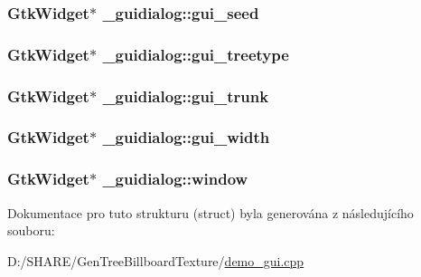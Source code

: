 \label{struct__guidialog_a129528d8a16803cce010dc3dfab8797a}
\hypertarget{struct__guidialog_a3c4e66ea5fc40eb370ec4f0d20e3bb1e}{
\subsubsection[{gui\_\-seed}]{\setlength{\rightskip}{0pt plus 5cm}GtkWidget$\ast$ {\bf \_\-guidialog::gui\_\-seed}}}
\label{struct__guidialog_a3c4e66ea5fc40eb370ec4f0d20e3bb1e}
\hypertarget{struct__guidialog_a48c9ce6f5655422686cd48b8ea56ebcc}{
\subsubsection[{gui\_\-treetype}]{\setlength{\rightskip}{0pt plus 5cm}GtkWidget$\ast$ {\bf \_\-guidialog::gui\_\-treetype}}}
\label{struct__guidialog_a48c9ce6f5655422686cd48b8ea56ebcc}
\hypertarget{struct__guidialog_a2fbdb60bde6048ad17547f30ec8e425e}{
\subsubsection[{gui\_\-trunk}]{\setlength{\rightskip}{0pt plus 5cm}GtkWidget$\ast$ {\bf \_\-guidialog::gui\_\-trunk}}}
\label{struct__guidialog_a2fbdb60bde6048ad17547f30ec8e425e}
\hypertarget{struct__guidialog_a144fa52345c7e50785032abf90e94e44}{
\subsubsection[{gui\_\-width}]{\setlength{\rightskip}{0pt plus 5cm}GtkWidget$\ast$ {\bf \_\-guidialog::gui\_\-width}}}
\label{struct__guidialog_a144fa52345c7e50785032abf90e94e44}
\hypertarget{struct__guidialog_acbf2d8b5cd9ceaaf91b42387cb07fe74}{
\subsubsection[{window}]{\setlength{\rightskip}{0pt plus 5cm}GtkWidget$\ast$ {\bf \_\-guidialog::window}}}
\label{struct__guidialog_acbf2d8b5cd9ceaaf91b42387cb07fe74}


Dokumentace pro tuto strukturu (struct) byla generována z následujícího souboru:\begin{DoxyCompactItemize}
\item 
D:/SHARE/GenTreeBillboardTexture/\hyperlink{demo__gui_8cpp}{demo\_\-gui.cpp}\end{DoxyCompactItemize}
